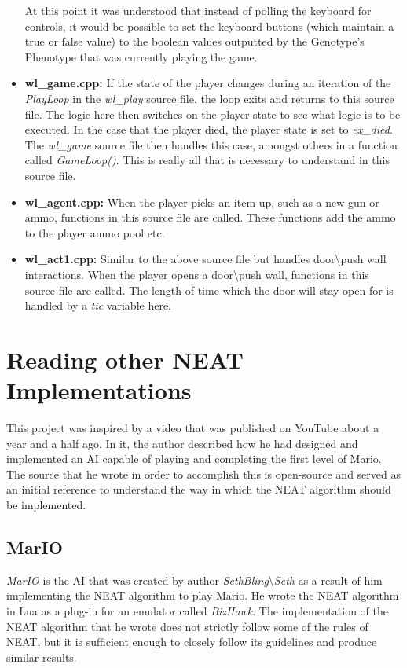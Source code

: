 \documentclass[]{Learning-to-Play-Wolfenstein-thesis}
\begin{document}
\begin{itemize}
At this point it was understood that instead of polling the keyboard for controls, it would be possible to set the keyboard buttons (which maintain a true or false value) to the boolean values outputted by the Genotype's Phenotype that was currently playing the game.
\item\textbf{wl\_game.cpp:} If the state of the player changes during an iteration of the \textit{PlayLoop} in the \textit{wl\_play} source file, the loop exits and returns to this source file. The logic here then switches on the player state to see what logic is to be executed. In the case that the player died, the player state is set to \textit{ex\_died}. The \textit{wl\_game} source file then handles this case, amongst others in a function called \textit{GameLoop()}. This is really all that is necessary to understand in this source file. 
\item\textbf{wl\_agent.cpp:} When the player picks an item up, such as a new gun or ammo, functions in this source file are called. These functions add the ammo to the player ammo pool etc. 
\item\textbf{wl\_act1.cpp:} Similar to the above source file but handles door\textbackslash push wall interactions. When the player opens a door\textbackslash push wall, functions in this source file are called. The length of time which the door will stay open for is handled by a \textit{tic} variable here.
\end{itemize}
\section{Reading other NEAT Implementations}
This project was inspired by a video that was published on YouTube about a year and a half ago. In it, the author described how he had designed and implemented an AI capable of playing and completing the first level of Mario. The source that he wrote in order to accomplish this is open-source and served as an initial reference to understand the way in which the NEAT algorithm should be implemented. 

\subsection{MarIO}
\textit{MarIO} is the AI that was created by author \textit{SethBling}\textbackslash \textit{Seth} as a result of him implementing the NEAT algorithm to play Mario. He wrote the NEAT algorithm in Lua as a plug-in for an emulator called \textit{BizHawk}. The implementation of the NEAT algorithm that he wrote does not strictly follow some of the rules of NEAT, but it is sufficient enough to closely follow its guidelines and produce similar results. 
\end{document}
